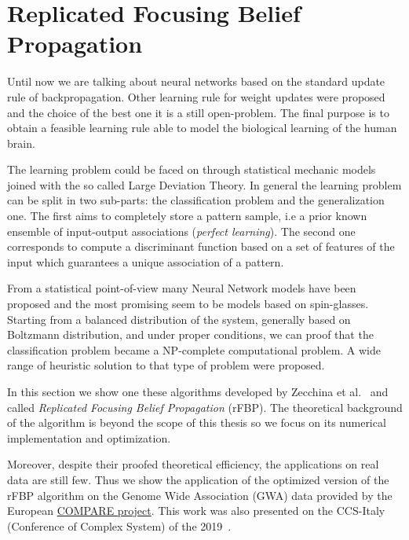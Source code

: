 \documentclass{standalone}
\begin{document}
\section[rFBP]{Replicated Focusing Belief Propagation}\label{rfbp}

Until now we are talking about neural networks based on the standard update rule of backpropagation.
Other learning rule for weight updates were proposed and the choice of the best one it is a still open-problem.
The final purpose is to obtain a feasible learning rule able to model the biological learning of the human brain.

The learning problem could be faced on through statistical mechanic models joined with the so called Large Deviation Theory.
In general the learning problem can be split in two sub-parts: the classification problem and the generalization one.
The first aims to completely store a pattern sample, i.e a prior known ensemble of input-output associations (\emph{perfect learning}).
The second one corresponds to compute a discriminant function based on a set of features of the input which guarantees a unique association of a pattern.

From a statistical point-of-view many Neural Network models have been proposed and the most promising seem to be models based on spin-glasses.
Starting from a balanced distribution of the system, generally based on Boltzmann distribution, and under proper conditions, we can proof that the classification problem became a NP-complete computational problem.
A wide range of heuristic solution to that type of problem were proposed.

In this section we show one these algorithms developed by Zecchina et al.~\cite{BaldassiE7655} and called \emph{Replicated Focusing Belief Propagation} (rFBP).
The theoretical background of the algorithm is beyond the scope of this thesis so we focus on its numerical implementation and optimization.

Moreover, despite their proofed theoretical efficiency, the applications on real data are still few.
Thus we show the application of the optimized version of the rFBP algorithm on the Genome Wide Association (GWA) data provided by the European \href{https://www.compare-europe.eu/}{COMPARE project}.
This work was also presented on the CCS-Italy (Conference of Complex System) of the 2019~\cite{DallOlioCCS19}.
\end{document}
